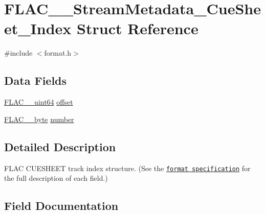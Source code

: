\hypertarget{struct_f_l_a_c_____stream_metadata___cue_sheet___index}{}\section{F\+L\+A\+C\+\_\+\+\_\+\+Stream\+Metadata\+\_\+\+Cue\+Sheet\+\_\+\+Index Struct Reference}
\label{struct_f_l_a_c_____stream_metadata___cue_sheet___index}


{\ttfamily \#include $<$format.\+h$>$}

\subsection*{Data Fields}
\begin{DoxyCompactItemize}
\item 
\hyperlink{ordinals_8h_aa78c8c70a3eb8a58af7436f278acde8e}{F\+L\+A\+C\+\_\+\+\_\+uint64} \hyperlink{struct_f_l_a_c_____stream_metadata___cue_sheet___index_ac221421bca83976925e2a41438157bb9}{offset}
\item 
\hyperlink{ordinals_8h_a5eb569b12d5b047cdacada4d57924ee3}{F\+L\+A\+C\+\_\+\+\_\+byte} \hyperlink{struct_f_l_a_c_____stream_metadata___cue_sheet___index_a71edc33c19a749f1dfb3d1429e08c77a}{number}
\end{DoxyCompactItemize}


\subsection{Detailed Description}
F\+L\+AC C\+U\+E\+S\+H\+E\+ET track index structure. (See the \href{../format.html#cuesheet_track_index}{\tt format specification} for the full description of each field.) 

\subsection{Field Documentation}
\mbox{\label{struct_f_l_a_c_____stream_metadata___cue_sheet___index_a71edc33c19a749f1dfb3d1429e08c77a}} 
